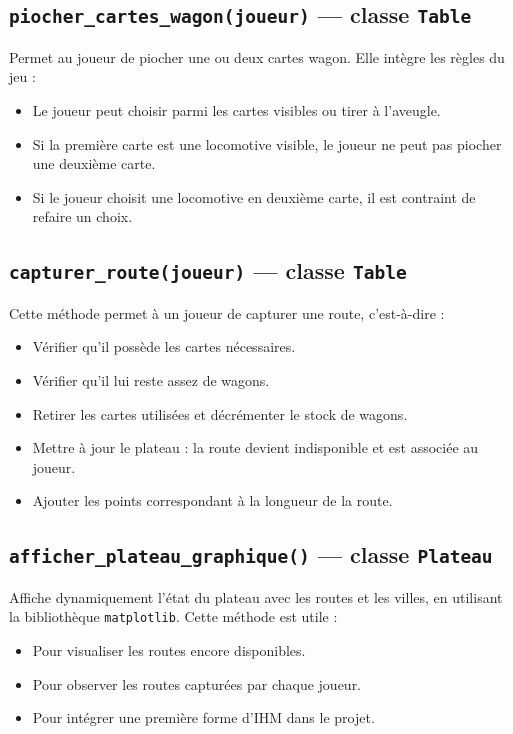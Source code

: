 \documentclass[a4paper,12pt]{report}
\begin{document}
\subsection*{\texttt{piocher\_cartes\_wagon(joueur)} — classe \texttt{Table}}

Permet au joueur de piocher une ou deux cartes wagon. Elle intègre les règles du jeu :
\begin{itemize}
    \item Le joueur peut choisir parmi les cartes visibles ou tirer à l’aveugle.
    \item Si la première carte est une locomotive visible, le joueur ne peut pas piocher une deuxième carte.
    \item Si le joueur choisit une locomotive en deuxième carte, il est contraint de refaire un choix.
\end{itemize}

\subsection*{\texttt{capturer\_route(joueur)} — classe \texttt{Table}}

Cette méthode permet à un joueur de capturer une route, c’est-à-dire :
\begin{itemize}
    \item Vérifier qu’il possède les cartes nécessaires.
    \item Vérifier qu’il lui reste assez de wagons.
    \item Retirer les cartes utilisées et décrémenter le stock de wagons.
    \item Mettre à jour le plateau : la route devient indisponible et est associée au joueur.
    \item Ajouter les points correspondant à la longueur de la route.
\end{itemize}

\subsection*{\texttt{afficher\_plateau\_graphique()} — classe \texttt{Plateau}}

Affiche dynamiquement l’état du plateau avec les routes et les villes, en utilisant la bibliothèque \texttt{matplotlib}.
Cette méthode est utile :
\begin{itemize}
    \item Pour visualiser les routes encore disponibles.
    \item Pour observer les routes capturées par chaque joueur.
    \item Pour intégrer une première forme d'IHM dans le projet.
\end{itemize}
\end{document}
